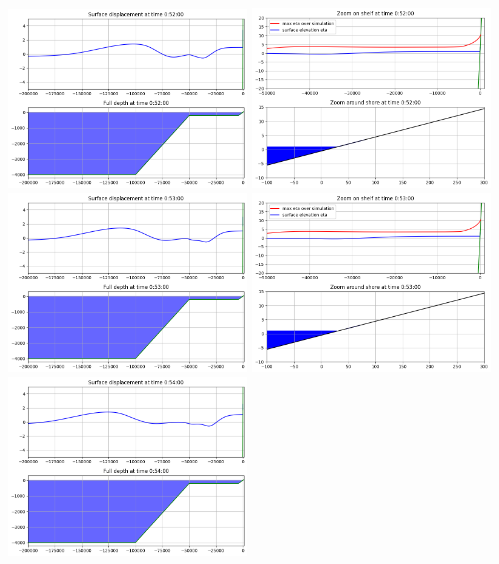 \documentclass[11pt]{article}
\begin{document}
\vskip 10pt 
\includegraphics[width=0.475\textwidth]{frame0052fig0.png}
\includegraphics[width=0.475\textwidth]{frame0052fig1.png}
\vskip 10pt 
\includegraphics[width=0.475\textwidth]{frame0053fig0.png}
\includegraphics[width=0.475\textwidth]{frame0053fig1.png}
\vskip 10pt 
\includegraphics[width=0.475\textwidth]{frame0054fig0.png}
\end{document}
